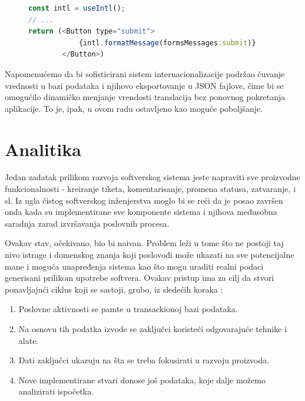 \documentclass[12pt,oneside]{memoir}
\begin{document}
\begin{figure}[h]
\begin{lstlisting}[language=JavaScript, style=ES6, caption={Korišćenje poruka}, label={lst:messagesusage}]
const intl = useIntl();
// ...
return (<Button type="submit">
            {intl.formatMessage(formsMessages.submit)}
        </Button>)
\end{lstlisting}
\end{figure}

Napomenućemo da bi sofisticirani sistem internacionalizacije podržao čuvanje vrednosti u bazi podataka i njihovo eksportovanje u JSON fajlove, čime bi se omogućilo dinamičko menjanje vrendosti translacija bez ponovnog pokretanja aplikacije. To je, ipak, u ovom radu ostavljeno kao moguće poboljšanje.


\chapter{Analitika}

Jedan zadatak prilikom razvoja softverskog sistema jeste napraviti sve proizvodne funkcionalnosti - kreiranje tiketa, komentarisanje, promena statusa, zatvaranje, i sl. Iz ugla čistog softverskog inženjerstva moglo bi se reći da je posao završen onda kada su implementirane sve komponente sistema i njihova međusobna saradnja zarad izvršavanja poslovnih procesa.

Ovakav stav, očekivano, bio bi naivan. Problem leži u tome što ne postoji taj nivo istrage i domenskog znanja koji poslovođi može ukazati na sve potencijalne mane i moguća unapređenja sistema kao što mogu uraditi realni podaci generisani prilikom upotrebe softvera. Ovakav pristup ima za cilj da stvori ponavljajući ciklus koji se sastoji, grubo, iz sledećih koraka \cite{dataanalytics}:
\begin{enumerate}
    \item Poslovne aktivnosti se pamte u transackionoj bazi podataka.
    \item Na osnovu tih podatka izvode se zaključci koristeći odgovarajuće tehnike i alate.
    \item Dati zaključci ukazuju na šta se treba fokusirati u razvoju proizvoda.
    \item Nove implementirane stvari donose još podataka, koje dalje možemo analizirati ispočetka.
\end{enumerate}
\end{document}
